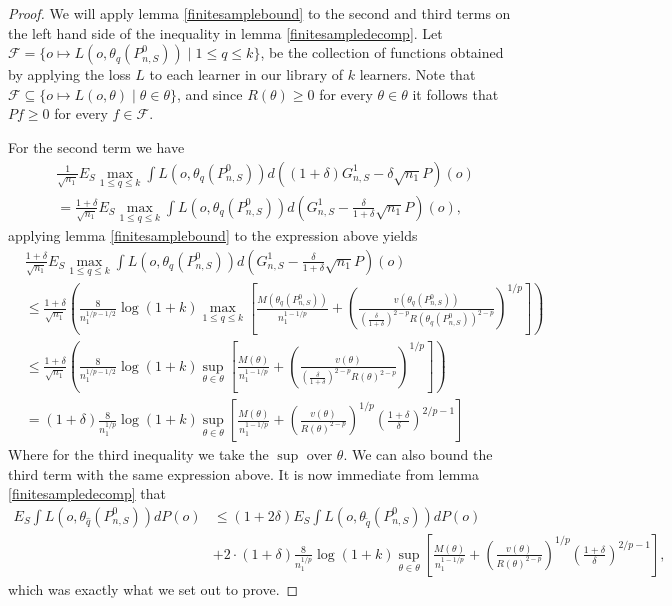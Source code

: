 \documentclass[11pt, a4paper]{article}
\theoremstyle{definition}
\theoremstyle{remark}
\newcommand{\q}{q}
\newcommand{\btheta}{\theta}
\begin{document}
\begin{proof}
    We will apply lemma \ref{finitesamplebound} to the second and third terms on the left hand side of the inequality in lemma \ref{finitesampledecomp}. Let $ \mathcal{F} = \{o \mapsto L(o, \btheta_{\q}(P_{n,S}^{0})) \mid 1 \leq \q \leq k\}$, be the collection of functions obtained by applying the loss $ L $ to each learner in our library of $ k $ learners. Note that $ \mathcal{F} \subseteq \{o \mapsto L(o, \btheta) \mid \btheta \in \btheta\} $, and since $ R(\btheta) \geq 0 $ for every $ \btheta \in \btheta $ it follows that $ Pf \geq 0 $ for every $ f \in \mathcal{F} $. 
   
For the second term we have 
\begin{align*}
&\frac{1}{\sqrt{n_1} } E_{S} \max_{1 \leq \q \leq k} \int L(o, \btheta_{\q}(P_{n, S}^{0})) d ((1 + \delta) G_{n,S}^{1} - \delta \sqrt{n_1} P)(o)\\
&= 
\frac{1 + \delta}{\sqrt{n_1} } E_{S} \max_{1 \leq \q \leq k} \int L(o, \btheta_{\q}(P_{n, S}^{0})) d (G_{n,S}^{1} - \frac{\delta }{1 + \delta} \sqrt{n_1} P)(o),
\end{align*}
applying lemma \ref{finitesamplebound} to the expression above yields 
\begin{align*}
&\frac{1 + \delta}{\sqrt{n_1} } E_{S} \max_{1 \leq \q \leq k} \int L(o, \btheta_{\q}(P_{n, S}^{0})) d (G_{n,S}^{1} - \frac{\delta }{1 + \delta} \sqrt{n_1} P)(o) \\
&\leq  \frac{1 + \delta}{\sqrt{n_1}}\left( \frac{8}{n_1^{1/p-1/2}} \log(1 + k) \max_{1 \leq \q \leq k} \left[ \frac{M(\btheta_{\q}(P_{n,S}^{0}))}{n_1^{1-1/p}} + \left( \frac{v(\btheta_{ \q}(P_{n,S}^0) )}{( \frac{\delta}{1 + \delta} )^{2-p} R(\btheta_{\q}(P_{n,S}^{0}))^{2-p}} \right)^{1/p} \right] \right)\\
&\leq  \frac{1 + \delta}{\sqrt{n_1}}\left( \frac{8}{n_1^{1/p-1/2}} \log(1 + k) \sup_{\btheta \in \btheta} \left[ \frac{M(\btheta)}{n_1^{1-1/p}} + \left( \frac{v(\btheta)}{( \frac{\delta}{1 + \delta} )^{2-p} R(\btheta)^{2-p}} \right)^{1/p} \right] \right)\\
&= (1 + \delta) \frac{8}{n_1^{1/p}} \log(1 + k) \sup_{\btheta \in \btheta} \left[ \frac{M(\btheta)}{n_1^{1-1/p}} + \left( \frac{v(\btheta)}{R(\btheta)^{2-p}} \right)^{1/p}\left( \frac{1 + \delta}{\delta}  \right)^{2/p-1} \right]  
\end{align*}
Where for the third inequality we take the $ \sup $ over $ \btheta $. We can also bound the third term with the same expression above. It is now immediate from lemma \ref{finitesampledecomp} that 
\begin{align*}
    E_{S} \int L(o, \btheta_{ \hat{\q} }(P_{n, S}^{0})) d P(o) &\leq (1 + 2 \delta) E_{S} \int L(o, \btheta_{ \tilde{\q} }(P_{n, S}^{0})) d P(o) \\
                                                               &+ 2 \cdot (1 + \delta) \frac{8}{n_1^{1/p}} \log(1 + k) \sup_{\btheta \in \btheta} \left[ \frac{M(\btheta)}{n_1^{1-1/p}} + \left( \frac{v(\btheta)}{R(\btheta)^{2-p}} \right)^{1/p}\left( \frac{1 + \delta}{\delta}  \right)^{2/p-1} \right],
\end{align*}
which was exactly what we set out to prove. 
\end{proof}
\end{document}
